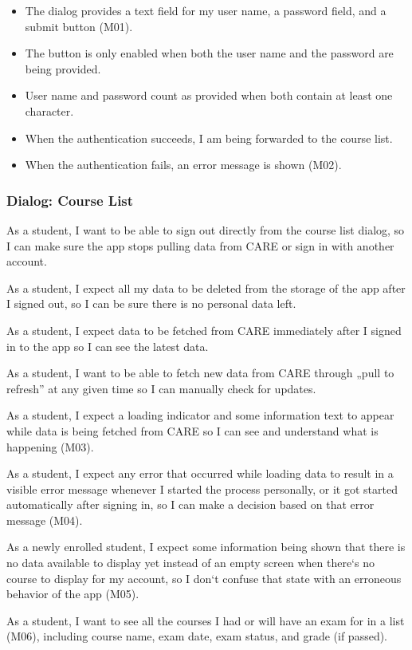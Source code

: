 \begin{itemize}
\item The dialog provides a text field for my user name, a password field, and a submit button (M01).
\item The button is only enabled when both the user name and the password are being provided.
\item User name and password count as provided when both contain at least one character.
\item When the authentication succeeds, I am being forwarded to the course list.
\item When the authentication fails, an error message is shown (M02).
\end{itemize}

\subsubsection*{Dialog: Course List}

As a student, I want to be able to sign out directly from the course list dialog, so I can make sure the app stops pulling data from CARE or sign in with another account.

As a student, I expect all my data to be deleted from the storage of the app after I signed out, so I can be sure there is no personal data left.

As a student, I expect data to be fetched from CARE immediately after I signed in to the app so I can see the latest data.

As a student, I want to be able to fetch new data from CARE through „pull to refresh” at any given time so I can manually check for updates.

As a student, I expect a loading indicator and some information text to appear while data is being fetched from CARE so I can see and understand what is happening (M03).

As a student, I expect any error that occurred while loading data to result in a visible error message whenever I started the process personally, or it got started automatically after signing in, so I can make a decision based on that error message (M04).

As a newly enrolled student, I expect some information being shown that there is no data available to display yet instead of an empty screen when there‘s no course to display for my account, so I don‘t confuse that state with an erroneous behavior of the app (M05).

As a student, I want to see all the courses I had or will have an exam for in a list (M06), including course name, exam date, exam status, and grade (if passed).

